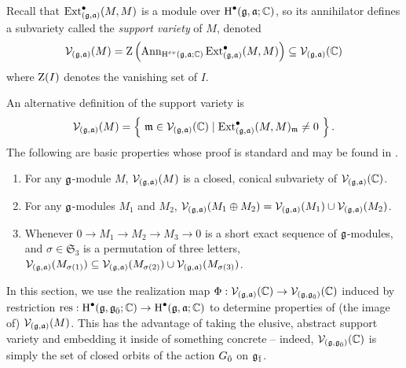 Recall that $\Ext_{(\g,\a)}^\bullet(M,M)$ is a module over $\H^\bullet(\g,\a;\CC)$, so its annihilator defines a subvariety called the \textit{support variety} of $M$, denoted
\[
  \V_{(\g,\a)}(M) = \Z\left({\Ann_{\H^{ev}(\g,\a;\CC)} \Ext_{(\g,\a)}^\bullet(M,M)}\right) \subseteq \V_{(\g,\a)}(\CC)
\]
where $\Z(I)$ denotes the vanishing set of $I$.

An alternative definition of the support variety is
\[
  \V_{(\g,\a)}(M) = \left\{~ \m \in \V_{(\g,\a)}(\CC) \mid \Ext_{(\g,\a)}^\bullet(M,M)_{\m} \neq 0 ~\right\}.
\]
The following are basic properties whose proof is standard and may be found in \cite{FP-unipotent}.

\begin{enumerate}
  \item For any $\g$-module $M$, $\V_{(\g,\a)}(M)$ is a closed, conical subvariety of $\V_{(\g,\a)}(\CC)$.
  \item For any $\g$-modules $M_1$ and $M_2$, $\V_{(\g,\a)}(M_1 \oplus M_2) = \V_{(\g,\a)}(M_1) \cup \V_{(\g,\a)}(M_2)$.
  \item Whenever $0 \to M_1 \to M_2 \to M_3 \to 0$ is a short exact sequence of $\g$-modules, and $\sigma \in \mathfrak{S}_3$ is a permutation of three letters, $\V_{(\g,\a)}(M_{\sigma(1)}) \subseteq \V_{(\g,\a)}(M_{\sigma(2)}) \cup \V_{(\g,\a)}(M_{\sigma(3)})$.
\end{enumerate}

In this section, we use the realization map $\Phi:\V_{(\g,\a)}(\CC) \to \V_{(\g,\even{\g})}(\CC)$ induced by restriction $\resmap: \H^\bullet(\g,\even{\g};\CC) \to \H^\bullet(\g,\a;\CC)$ to determine properties of (the image of) $\V_{(\g,\a)}(M)$. This has the advantage of taking the elusive, abstract support variety and embedding it inside of something concrete -- indeed, $\V_{(\g,\even{\g})}(\CC)$ is simply the set of closed orbits of the action $\even{G}$ on $\odd{\g}$.



